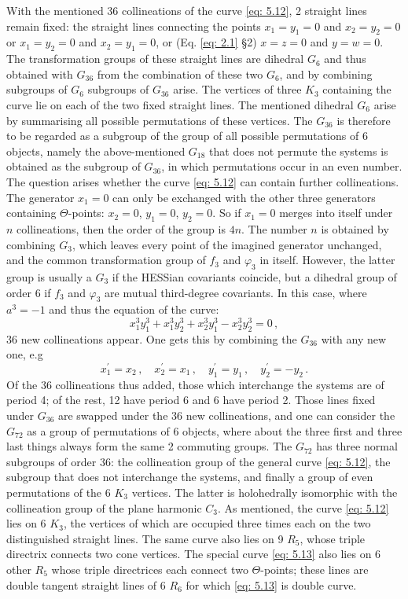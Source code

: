 \documentclass[leqno]{article}
\begin{document}
With the mentioned 36 collineations of the curve \eqref{eq: 5.12}, 2 straight lines remain fixed: the straight lines connecting the points $x_1 = y_1 = 0$ and $x_2 = y_2 = 0$ or $x_1 = y_2 = 0$ and $x_2 = y_1 = 0$, or (Eq. \eqref{eq: 2.1} \S 2) $x=z=0$ and $y=w=0$. The transformation groups of these straight lines are dihedral $G_6$ and thus obtained with $G_{36}$ from the combination of these two $G_6$, and by combining subgroups of $G_6$ subgroups of $G_{36}$ arise. The vertices of three $K_3$ containing the curve lie on each of the two fixed straight lines. The mentioned dihedral $G_6$ arise by summarising all possible permutations of these vertices. The $G_{36}$ is therefore to be regarded as a subgroup of the group of all possible permutations of 6 objects, namely the above-mentioned $G_{18}$ that does not permute the systems is obtained as the subgroup of $G_{36}$, in which permutations occur in an even number. \\
The question arises whether the curve \eqref{eq: 5.12} can contain further collineations. The generator $x_1=0$ can only be exchanged with the other three generators containing $\Theta$-points: $x_2=0$, $y_1=0$, $y_2=0$. So if $x_1=0$ merges into itself under $n$ collineations, then the order of the group is $4n$. The number $n$ is obtained by combining $G_3$, which leaves every point of the imagined generator unchanged, and the common transformation group of $f_3$ and $\varphi_3$ in itself. However, the latter group is usually a $G_3$ if the HESSian covariants coincide, but a dihedral group of order 6 if $f_3$ and $\varphi_3$ are mutual third-degree covariants. In this case, where $a^3=-1$ and thus the equation of the curve: 
\begin{equation}\label{eq: 5.13}
x_1^3 y_1^3 + x_1^3 y_2^3 + x_2^3 y_1^3 - x_2^3 y_2^3 = 0 \, , \tag{13}
\end{equation} 36 new collineations appear. One gets this by combining the $G_{36}$ with any new one, e.g
\[
x_1^\prime = x_2 \, , \quad x_2^\prime = x_1 \, , \quad y_1^\prime = y_1 \, , \quad y_2^\prime = - y_2 \, . 
\]
Of the 36 collineations thus added, those which interchange the systems are of period 4; of the rest, 12 have period 6 and 6 have period 2. Those lines fixed under $G_{36}$ are swapped under the 36 new collineations, and one can consider the $G_{72}$ as a group of permutations of 6 objects, where about the three first and three last things always form the same 2 commuting groups. The $G_{72}$ has three normal subgroups of order 36: the collineation group of the general curve \eqref{eq: 5.12}, the subgroup that does not interchange the systems, and finally a group of even permutations of the 6 $K_3$ vertices. The latter is holohedrally isomorphic with the collineation group of the plane harmonic $C_3$. As mentioned, the curve \eqref{eq: 5.12} lies on 6 $K_3$, the vertices of which are occupied three times each on the two distinguished straight lines. The same curve also lies on 9 $R_5$, whose triple directrix connects two cone vertices. The special curve \eqref{eq: 5.13} also lies on 6 other $R_5$ whose triple directrices each connect two $\Theta$-points; these lines are double tangent straight lines of 6 $R_6$ for which \eqref{eq: 5.13} is double curve. \\
\end{document}
